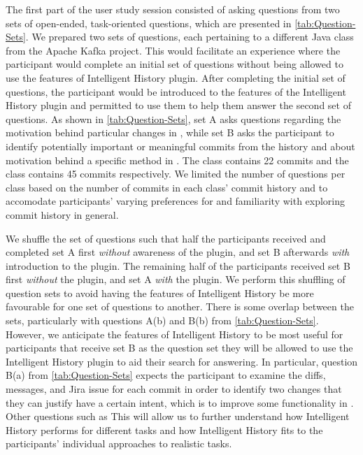 The first part of the user study session consisted of asking questions from two sets of open-ended, task-oriented questions, which are presented in \autoref{tab:Question-Sets}.
We prepared two sets of questions, each pertaining to a different Java class from the Apache Kafka project.
This would facilitate an experience where the participant would complete an initial set of questions without being allowed to use the features of Intelligent History plugin.
After completing the initial set of questions, the participant would be introduced to the features of the Intelligent History plugin and permitted to use them to help them answer the second set of questions.
As shown in \autoref{tab:Question-Sets}, set A asks questions regarding the motivation behind particular changes in , while set B asks the participant to identify potentially important or meaningful commits from the history and about motivation behind a specific method in .
The  class contains 22 commits and the  class contains 45 commits respectively.
We limited the number of questions per class based on the number of commits in each class' commit history and to accomodate participants' varying preferences for and familiarity with exploring commit history in general.


We shuffle the set of questions such that half the participants received and completed set A first \emph{without} awareness of the plugin, and set B afterwards \emph{with} introduction to the plugin.
The remaining half of the participants received set B first \emph{without} the plugin, and set A \emph{with} the plugin.
We perform this shuffling of question sets to avoid having the features of Intelligent History be more favourable for one set of questions to another.
There is some overlap between the sets, particularly with questions A(b) and B(b) from \autoref{tab:Question-Sets}.
However, we anticipate the features of Intelligent History to be most useful for participants that receive set B as the question set they will be allowed to use the Intelligent History plugin to aid their search for answering.
In particular, question B(a) from \autoref{tab:Question-Sets} expects the participant to examine the diffs, messages, and Jira issue for each commit in order to identify two changes that they can justify have a certain intent, which is to improve some functionality in . 
Other questions such as 
This will allow us to further understand how Intelligent History performs for different tasks and how Intelligent History fits to the participants' individual approaches to realistic tasks.

